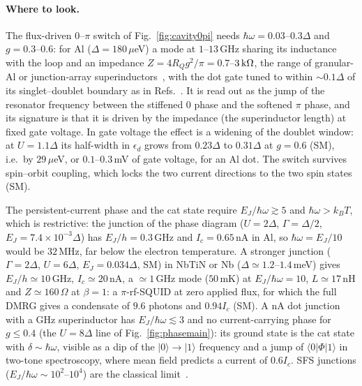 \paragraph*{Where to look.}
The flux-driven $0$--$\pi$ switch of Fig.~\ref{fig:cavity0pi} needs $\hbar\omega=0.03$--$0.3\Delta$ and
$g=0.3$--$0.6$: for Al ($\Delta=180\,\mu$eV) a mode at $1$--$13$\,GHz sharing its inductance with the loop
and an impedance $Z=4R_Qg^2/\pi=0.7$--$3\,{\rm k}\Omega$, the range of granular-Al or junction-array
superinductors~\cite{Manucharyan2009,Grunhaupt2019}, with the dot gate tuned to within $\sim0.1\Delta$ of
its singlet--doublet boundary as in Refs.~\cite{Bargerbos2022,PitaVidal2023}. It is read out as the jump
of the resonator frequency between the stiffened $0$ phase and the softened $\pi$ phase, and its
signature is that it is driven by the impedance (the superinductor length) at fixed gate voltage. In gate
voltage the effect is a widening of the doublet window: at $U=1.1\Delta$ its half-width in $\epsilon_d$ grows
from $0.23\Delta$ to $0.31\Delta$ at $g=0.6$ (SM), i.e.\ by $29\,\mu$eV, or $0.1$--$0.3$\,mV of gate voltage,
for an Al dot. The switch survives spin--orbit coupling, which locks the two current directions to the two
spin states (SM).

The persistent-current phase and the cat state require $E_J/\hbar\omega\gtrsim5$ and $\hbar\omega>k_BT$,
which is restrictive: the junction of the phase diagram ($U=2\Delta$, $\Gamma=\Delta/2$,
$E_J=7.4\times10^{-3}\Delta$) has $E_J/h=0.3$\,GHz and $I_c=0.65$\,nA in Al, so $\hbar\omega=E_J/10$ would be
$32$\,MHz, far below the electron temperature. A stronger junction ($\Gamma=2\Delta$, $U=6\Delta$,
$E_J=0.034\Delta$, SM) in NbTiN or Nb ($\Delta\simeq1.2$--$1.4$\,meV) gives $E_J/h\simeq10$\,GHz,
$I_c\simeq20$\,nA, a $\simeq1$\,GHz mode ($50$\,mK) at $E_J/\hbar\omega=10$, $L\simeq17$\,nH and
$Z\simeq160\,\Omega$ at $\beta=1$: a $\pi$-rf-SQUID at zero applied flux, for which the full DMRG gives a
condensate of $9.6$ photons and $0.94I_c$ (SM). A nA dot junction with a GHz superinductor has
$E_J/\hbar\omega\lesssim3$ and no current-carrying phase for $g\le0.4$ (the $U=8\Delta$ line of
Fig.~\ref{fig:phasemain}): its ground state is the cat state with $\delta\sim\hbar\omega$, visible as a dip of
the $|0\rangle\to|1\rangle$ frequency and a jump of $\langle0|\Phi|1\rangle$ in two-tone spectroscopy, where mean
field predicts a current of $0.6I_c$. SFS junctions ($E_J/\hbar\omega\sim10^2$--$10^4$) are the classical
limit~\cite{Ryazanov2001,Bauer2004}.

